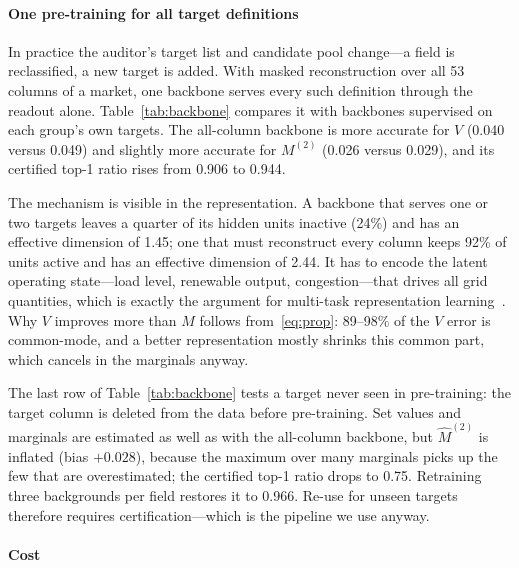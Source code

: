 \paragraph{One pre-training for all target definitions}
In practice the auditor's target list and candidate pool change---a field is reclassified, a new
target is added. With masked reconstruction over all 53 columns of a market, one backbone serves
every such definition through the readout alone. Table~\ref{tab:backbone} compares it with
backbones supervised on each group's own targets. The all-column backbone is more accurate for
$V$ (0.040 versus 0.049) and slightly more accurate for $M^{(2)}$ (0.026 versus 0.029), and its
certified top-1 ratio rises from 0.906 to 0.944.

The mechanism is visible in the representation. A backbone that serves one or two targets leaves a
quarter of its hidden units inactive (24\%) and has an effective dimension of 1.45; one that must
reconstruct every column keeps 92\% of units active and has an effective dimension of 2.44. It has
to encode the latent operating state---load level, renewable output, congestion---that drives all
grid quantities, which is exactly the argument for multi-task representation
learning~\cite{caruana1997multitask,baxter2000inductive,maurer2016benefit}. Why $V$ improves more
than $M$ follows from~\eqref{eq:prop}: 89--98\% of the $V$ error is common-mode, and a better
representation mostly shrinks this common part, which cancels in the marginals anyway.

The last row of Table~\ref{tab:backbone} tests a target never seen in pre-training: the target
column is deleted from the data before pre-training. Set values and marginals are estimated as well
as with the all-column backbone, but $\hat M^{(2)}$ is inflated (bias $+0.028$), because the
maximum over many marginals picks up the few that are overestimated; the certified top-1 ratio drops
to 0.75. Retraining three backgrounds per field restores it to 0.966. Re-use for unseen targets
therefore requires certification---which is the pipeline we use anyway.



\paragraph{Cost}

